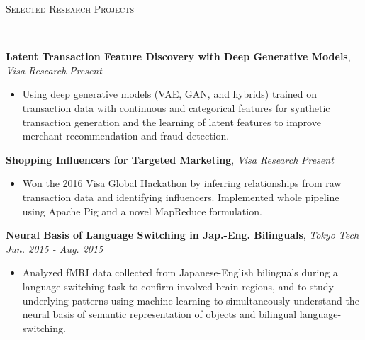 \documentclass[9pt]{article}
\newenvironment{changemargin}[2]{%
  \begin{list}{}{%
    \setlength{\topsep}{0pt}%
    \setlength{\leftmargin}{#1}%
    \setlength{\rightmargin}{#2}%
    \setlength{\listparindent}{\parindent}%
    \setlength{\itemindent}{\parindent}%
    \setlength{\parsep}{\parskip}%
  }%
  \item[]}{\end{list}
}
\newcommand{\lineover}{
	\begin{changemargin}{-0.05in}{-0.05in}
		\vspace*{-8pt}
		\hrulefill \\
		\vspace*{-2pt}
	\end{changemargin}
}
\newcommand{\header}[1]{
	\begin{changemargin}{-0.5in}{-0.5in}
		\scshape{#1}\\
  	\lineover
	\end{changemargin}
}
\newenvironment{body} {
	\vspace*{-16pt}
	\begin{changemargin}{-0.25in}{-0.5in}
  }	
	{\end{changemargin}
}
\begin{document}
\header{Selected Research Projects}
\begin{body}
	\vspace{16pt}
    \textbf{Latent Transaction Feature Discovery with Deep Generative Models}, \emph{Visa Research} \hfill \emph{Present}
    \vspace*{-3pt}
    \begin{itemize} \itemsep -0pt
	\item Using deep generative models (VAE, GAN, and hybrids) trained on transaction data with continuous and categorical features for synthetic transaction generation and the learning of latent features to improve merchant recommendation and fraud detection.
	\end{itemize}
	\vspace*{-3pt}
    \textbf{Shopping Influencers for Targeted Marketing}, \emph{Visa Research} \hfill \emph{Present} \\
		\vspace*{-3pt}
	\begin{itemize} \itemsep -0pt
	\item Won the 2016 Visa Global Hackathon by inferring relationships from raw transaction data and identifying influencers. Implemented whole pipeline using Apache Pig and a novel MapReduce formulation.
	\end{itemize}
	\vspace*{-3pt}
	\textbf{Neural Basis of Language Switching in Jap.-Eng. Bilinguals}, \emph{Tokyo Tech} \hfill \emph{Jun. 2015 - Aug. 2015} \\
		\vspace*{-3pt}
	\begin{itemize} \itemsep -0pt
	\item Analyzed fMRI data collected from Japanese-English bilinguals during a language-switching task to confirm involved brain regions, and to study underlying patterns using machine learning to simultaneously understand the neural basis of semantic representation of objects and bilingual language-switching.

\end{itemize}
\end{body}
\end{document}
